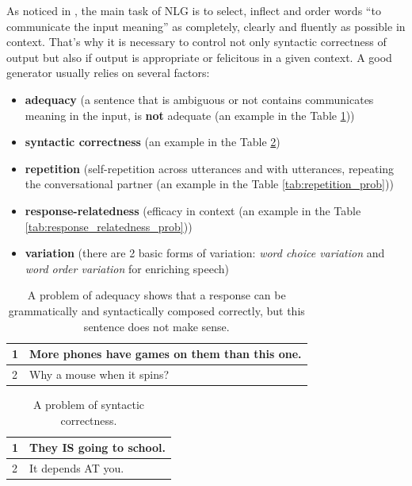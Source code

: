 As noticed in \cite{stent2005evaluating}, the main task of NLG is to select, inflect and order words ``to communicate the input meaning'' as completely, clearly and fluently as possible in context. That's why it is necessary to control not only syntactic correctness of output but also if output is appropriate or felicitous in a given context. A good generator usually relies on several factors:
\begin{itemize}
  \item \textbf{adequacy} (a sentence that is ambiguous or not contains communicates meaning in the input, is \textbf{not} adequate (an example in the Table \ref{tab:adequacy_prob}))  
  \item \textbf{syntactic correctness} (an example in the Table \ref{tab:syntactic_corr_prob})
  \item \textbf{repetition} (self-repetition across utterances and with utterances, repeating the conversational partner (an example in the Table \ref{tab:repetition_prob}))
  \item \textbf{response-relatedness} (efficacy in context (an example in the Table \ref{tab:response_relatedness_prob}))
  \item \textbf{variation} (there are 2 basic forms of variation: \textit{word choice variation} and \textit{word order variation} for enriching speech)
\end{itemize}

\begin{table}[t]
\centering
 \begin{tabular}{|p{0.5cm}|p{8cm}|} 
 \hline
 1 & More phones have games on them than this one. \\
 \hline
 2 & Why a mouse when it spins? \\
 \hline
 \end{tabular}
 \caption{A problem of adequacy shows that a response can be grammatically and syntactically composed correctly, but this sentence does not make sense.}
\label{tab:adequacy_prob}
\end{table}

\begin{table}[t]
\centering
 \begin{tabular}{|p{0.5cm}|p{8cm}|} 
 \hline
 1 & They IS going to school. \\ 
 \hline
 2 & It depends AT you. \\
 \hline
 \end{tabular}
 \caption{A problem of syntactic correctness.}
\label{tab:syntactic_corr_prob}
\end{table}

